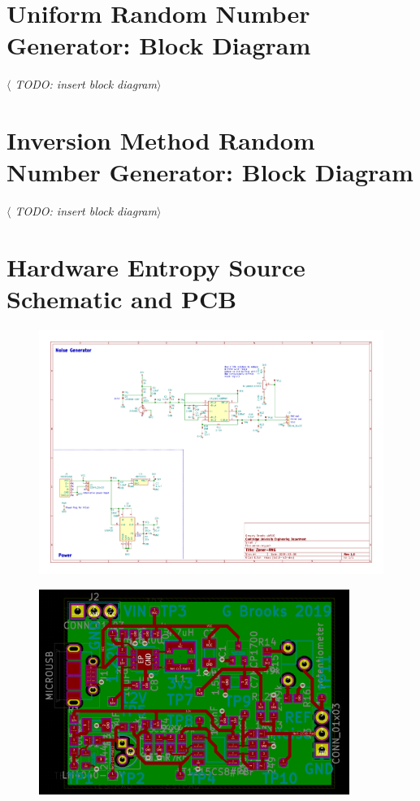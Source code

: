 \documentclass[12pt]{article}
\begin{document}
\begin{appendix}
  \section{Uniform Random Number Generator: Block Diagram}
    \textit{$\langle$ TODO: insert block diagram$\rangle$}



  \section{Inversion Method Random Number Generator: Block Diagram}
    \textit{$\langle$ TODO: insert block diagram$\rangle$}


  \newpage
  \section{Hardware Entropy Source Schematic and PCB}
  \vspace{-1cm}
    \begin{figure}[H]
      \centering
      \includegraphics[angle=90,width=\textwidth]{fig/schematic.pdf}
      \label{fig:schematic}
    \end{figure}

    \newpage

    \vspace{-1.5cm}
    \begin{figure}[H]
      \centering
      \includegraphics[angle=90, width=0.9\textwidth]{fig/pcb.PNG}
      \label{fig:pcb}
    \end{figure}


\end{appendix}
\end{document}
